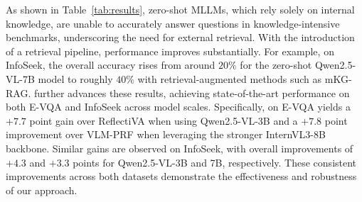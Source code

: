 As shown in Table~\ref{tab:results}, zero-shot MLLMs, which rely solely on internal knowledge, are unable to accurately answer questions in knowledge-intensive benchmarks, underscoring the need for external retrieval. With the introduction of a retrieval pipeline, performance improves substantially. For example, on InfoSeek, the overall accuracy rises from around $20\%$ for the zero-shot Qwen2.5-VL-7B model to roughly $40\%$ with retrieval-augmented methods such as mKG-RAG. \ours further advances these results, achieving state-of-the-art performance on both E-VQA and InfoSeek across model scales. Specifically, on E-VQA \ours yields a $+7.7$ point gain over ReflectiVA when using Qwen2.5-VL-3B and a $+7.8$ point improvement over VLM-PRF when leveraging the stronger InternVL3-8B backbone.
Similar gains are observed on InfoSeek, with overall improvements of $+4.3$ and $+3.3$ points for Qwen2.5-VL-3B and 7B, respectively. These consistent improvements across both datasets demonstrate the effectiveness and robustness of our approach.





\begin{table}[t]
\caption{VQA accuracy scores on Encyclopedic-VQA and InfoSeek with oracle Wikipedia pages. }
  \label{tab:results_oracle}
    \vspace{-0.25cm}
  \centering
  \setlength{\tabcolsep}{.18em}
\vspace{-0.35cm}
\end{table}


